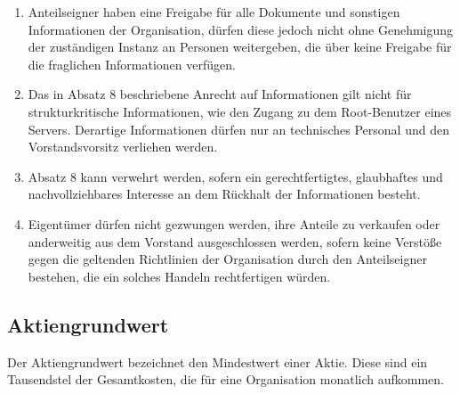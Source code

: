 \documentclass{article}
\begin{document}
\begin{enumerate}[(1)]
	\item Anteilseigner haben eine Freigabe für alle Dokumente und sonstigen Informationen der Organisation, dürfen diese jedoch nicht ohne Genehmigung der zuständigen Instanz an Personen weitergeben, die über keine Freigabe für die fraglichen Informationen verfügen.
	\item Das in Absatz 8 beschriebene Anrecht auf Informationen gilt nicht für strukturkritische Informationen, wie den Zugang zu dem Root-Benutzer eines Servers. Derartige Informationen dürfen nur an technisches Personal und den Vorstandsvorsitz verliehen werden.
	\item Absatz 8 kann verwehrt werden, sofern ein gerechtfertigtes, glaubhaftes und nachvollziehbares Interesse an dem Rückhalt der Informationen besteht.
	\item Eigentümer dürfen nicht gezwungen werden, ihre Anteile zu verkaufen oder anderweitig aus dem Vorstand ausgeschlossen werden, sofern keine Verstöße gegen die geltenden Richtlinien der Organisation durch den Anteilseigner bestehen, die ein solches Handeln rechtfertigen würden.
\end{enumerate}

\subsection{Aktiengrundwert}
Der Aktiengrundwert bezeichnet den Mindestwert einer Aktie. Diese sind ein Tausendstel der Gesamtkosten, die für eine Organisation monatlich aufkommen.
\end{document}
